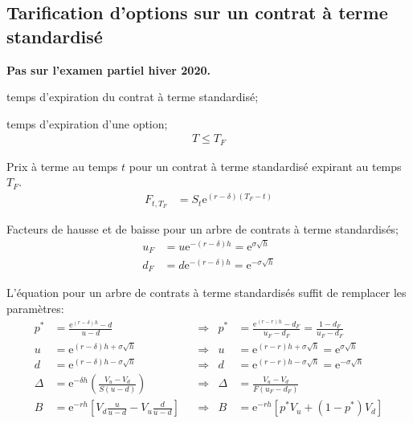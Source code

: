 \documentclass[10pt, french]{article}
\begin{document}
\begin{multicols*}{2}
\subsection{Tarification d'options sur un contrat à terme standardisé}
\textbf{Pas sur l'examen partiel hiver 2020.}

\begin{distributions}[Notation]
\begin{description}[leftmargin = *]
	\item[$T_{F}$]	temps d'expiration du contrat à terme standardisé;
	\item[$T$]	temps d'expiration d'une option;
		\begin{align*}
		T \le T_{F}
		\end{align*}
	\item[$F_{t, T_{F}}$]	Prix à terme au temps $t$ pour un contrat à terme standardisé expirant au temps $T_{F}$.
		\begin{align*}
		F_{t, T_{F}}
		&=	S_{t} \textrm{e}^{(r - \delta)(T_{F} - t)}
		\end{align*}
	\item[$u_{F}$ et $d_{F}$]	Facteurs de hausse et de baisse pour un arbre de contrats à terme standardisés;
		\begin{align*}
		u_{F}	
		&=	u \textrm{e}^{-(r - \delta)h}	=	\textrm{e}^{\sigma \sqrt{h}}	\\
		d_{F}
		&=	d \textrm{e}^{-(r - \delta)h}	=	\textrm{e}^{-\sigma \sqrt{h}}
		\end{align*}
\end{description}
\end{distributions}

L'équation pour un arbre de contrats à terme standardisés suffit de remplacer les paramètres:
\begin{align*}
	p^{*}	
		&=	\frac{\textrm{e}^{(r - \delta)h} - d}{u - d}	&
	&\Rightarrow	&
	p^{*}	
		&=	\frac{\textrm{e}^{(r -r)h} - d_{F}}{u_{F} - d_{F}}
		=	\frac{1 - d_{F}}{u_{F} - d_{F}}	\\
	u	
		&=	\textrm{e}^{(r - \delta)h + \sigma \sqrt{h}}	&
	&\Rightarrow	&
	u	
		&=	\textrm{e}^{(r - r)h + \sigma \sqrt{h}}	
		=	\textrm{e}^{\sigma \sqrt{h}}	\\
	d	
		&=	\textrm{e}^{(r - \delta)h - \sigma \sqrt{h}}	&
	&\Rightarrow	&
	d	
		&=	\textrm{e}^{(r - r)h - \sigma \sqrt{h}}	
		=	\textrm{e}^{-\sigma \sqrt{h}}	\\
	\Delta
		&=	\textrm{e}^{-\delta h} \left(\frac{V_{u} - V_{d}}{S(u - d)}\right)	&
	&\Rightarrow	&
	\Delta
		&=	\frac{V_{u} - V_{d}}{F(u_{F} - d_{F})}	\\
	B	
		&=	\textrm{e}^{-rh} \left[V_{d} \frac{u}{u - d} - V_{u}\frac{d}{u - d}\right]	&
	&\Rightarrow	&
	B
		&=	\textrm{e}^{-rh} [p^{*} V_{u} + (1 - p^{*}) V_{d}]
\end{align*}


\end{multicols*}
\end{document}
